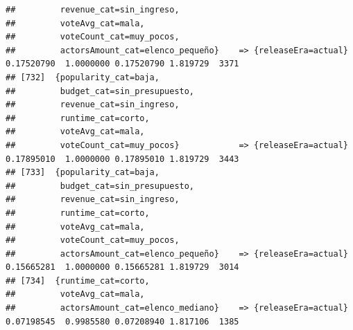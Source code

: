 \documentclass[
]{article}
\begin{document}
\begin{verbatim}
##         revenue_cat=sin_ingreso,                                                                                                
##         voteAvg_cat=mala,                                                                                                       
##         voteCount_cat=muy_pocos,                                                                                                
##         actorsAmount_cat=elenco_pequeño}    => {releaseEra=actual}               0.17520790  1.0000000 0.17520790 1.819729  3371
## [732]  {popularity_cat=baja,                                                                                                    
##         budget_cat=sin_presupuesto,                                                                                             
##         revenue_cat=sin_ingreso,                                                                                                
##         runtime_cat=corto,                                                                                                      
##         voteAvg_cat=mala,                                                                                                       
##         voteCount_cat=muy_pocos}            => {releaseEra=actual}               0.17895010  1.0000000 0.17895010 1.819729  3443
## [733]  {popularity_cat=baja,                                                                                                    
##         budget_cat=sin_presupuesto,                                                                                             
##         revenue_cat=sin_ingreso,                                                                                                
##         runtime_cat=corto,                                                                                                      
##         voteAvg_cat=mala,                                                                                                       
##         voteCount_cat=muy_pocos,                                                                                                
##         actorsAmount_cat=elenco_pequeño}    => {releaseEra=actual}               0.15665281  1.0000000 0.15665281 1.819729  3014
## [734]  {runtime_cat=corto,                                                                                                      
##         voteAvg_cat=mala,                                                                                                       
##         actorsAmount_cat=elenco_mediano}    => {releaseEra=actual}               0.07198545  0.9985580 0.07208940 1.817106  1385

\end{verbatim}
\end{document}
